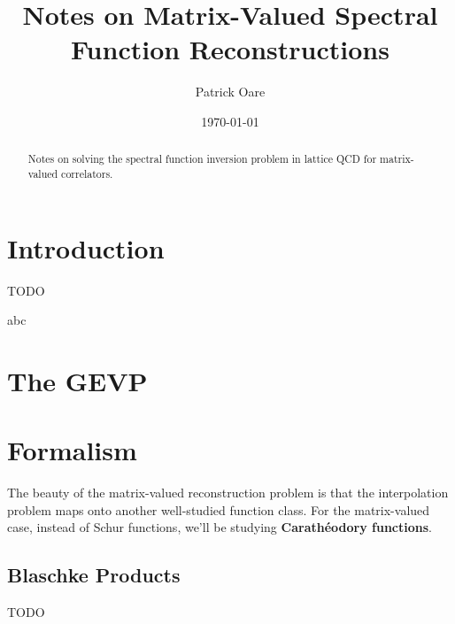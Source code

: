 \def \root {../../..}			%


\usepackage[toc,page]{appendix}
\usepackage{listings}

\newcommand{\poarecomment}[1]{\textcolor{red}{#1}}


\usepackage[numbers,sort&compress]{natbib}

\renewcommand{\im}{\mathrm{Im}}
\newcommand{\re}{\mathrm{Re}}
\newcommand{\esssup}{\mathrm{ess}\,\mathrm{sup}}



\title{Notes on Matrix-Valued Spectral Function Reconstructions}
\author{Patrick Oare}

\date{\today}

\maketitle

\begin{abstract}
Notes on solving the spectral function inversion problem in lattice QCD for matrix-valued correlators. 
\end{abstract}

\section{Introduction}

TODO

abc

\section{The GEVP}

\section{Formalism}

The beauty of the matrix-valued reconstruction problem is that the interpolation problem maps onto another well-studied function class. For the matrix-valued case, instead of Schur functions, we'll be studying \textbf{Carath\'eodory functions}. 




\newpage
\begin{appendices}

\newpage
\section{Blaschke Products}
\label{app:blaschke}

TODO
\end{appendices}

